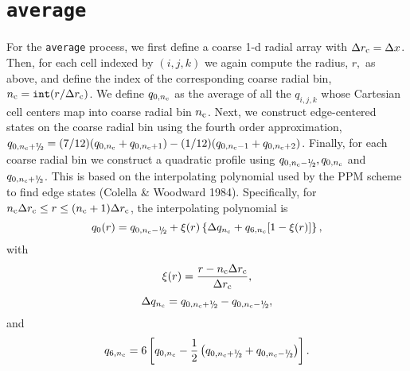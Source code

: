 \section{{\tt average}}\label{Sec:Avg}
For the {\tt average} process, we first define a coarse 1-d radial array 
with $\Delta r_{\rm c} = \Delta x$.  Then, for each cell indexed by
$(i,j,k)$ we again compute the radius, $r,$ as above, and 
define the index of the corresponding coarse radial bin, 
$n_{\rm c} = \mathtt{int}(r / \Delta r_{\rm c})$.  
We define $q_{0,n_{\rm c}}$ as the average of all the $q_{i,j,k}$ whose 
Cartesian cell centers map into coarse radial bin $n_{\rm c}$.
Next, we construct edge-centered states on the coarse radial bin using 
the fourth order approximation,
$q_{0,n_{\rm c}+\myhalf} = (7/12)(q_{0,n_{\rm c}}+q_{0,n_{\rm c}+1}) 
- (1/12)(q_{0,n_{\rm c}-1}+q_{0,n_{\rm c}+2})$.  Finally, for each coarse radial bin
we construct a quadratic profile using $q_{0,n_{\rm c}-\myhalf}, q_{0,n_{\rm c}}$ 
and $q_{0,n_{\rm c}+\myhalf}$.  This is based on the interpolating polynomial used by 
the PPM scheme to find edge states (Colella \& Woodward 1984).  Specifically, for 
$n_{\rm c}\Delta r_{\rm c} \le r \le (n_{\rm c}+1)\Delta r_{\rm c}$, the 
interpolating polynomial is
\begin{equation}
q_0(r) = q_{0,n_{\rm c}-\myhalf} + \xi(r)\left\{\Delta q_{n_{\rm c}} + q_{6,n_{\rm c}}[1 - \xi(r)]\right\},
\end{equation}
with
\begin{equation}
\xi(r) = \frac{r - n_{\rm c}\Delta r_{\rm c}}{\Delta r_{\rm c}},
\end{equation}
\begin{equation}
\Delta q_{n_{\rm c}} = q_{0,n_{\rm c}+\myhalf} - q_{0,n_{\rm c}-\myhalf},
\end{equation}
and
\begin{equation}
q_{6,n_{\rm c}} = 6\left[q_{0,n_{\rm c}} - 
\frac{1}{2}\left(q_{0,n_{\rm c}+\myhalf} + q_{0,n_{\rm c}-\myhalf}\right)\right].
\end{equation}

